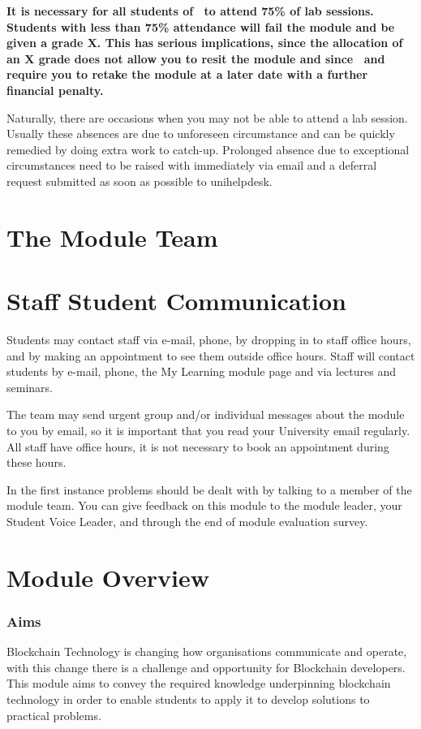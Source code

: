 \documentclass{MDXHandbook}
\begin{document}
{\bf It is necessary for all students of \moduleCode\  to attend 75\% of lab sessions. Students with less than 75\% attendance will fail the module and be given a grade X. This has serious implications, since the allocation of an X grade does not allow you to resit the module and since \moduleCode\  and require you to retake the module at a later date with a further financial penalty.

Naturally, there are occasions when you may not be able to attend a lab session. Usually these absences are due to unforeseen circumstance and can be quickly remedied by doing extra work to catch-up. Prolonged absence due to exceptional circumstances need to be raised with \moduleLeader immediately via email and a deferral request submitted as soon as possible to unihelpdesk.

\section{The Module Team}
\moduleStaff[role = Module Leader, room=\office, telephone = \tel, email = \email, photo=bigcrop.jpg]{\moduleLeader}


\newpage
\section{Staff Student Communication}
Students may contact staff via e-mail, phone, by dropping in to staff office hours, and by making an appointment to see them outside office hours. 
Staff will contact students by e-mail, phone, the My Learning module page and via lectures and seminars.

The team may send urgent group and/or individual messages about the module to you by email, so it is important that you read your University email regularly.
All staff have office hours, it is not necessary to book an appointment during these hours.

In the first instance problems should be dealt with by talking to a member of the module team. You can give feedback on this module to the module leader, your Student Voice Leader, and through the end of module evaluation survey.

\section{Module Overview}
\subsubsection{Aims}
Blockchain Technology is changing how organisations communicate and operate, with this change there is a challenge and opportunity for Blockchain developers. This module aims to convey the required knowledge underpinning blockchain technology in order to enable students to apply it to develop solutions to practical problems.


}
\end{document}
